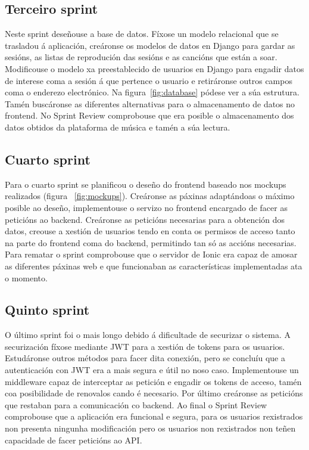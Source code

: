 \subsection{Terceiro sprint}
Neste sprint deseñouse a base de datos. Fíxose un modelo relacional que se trasladou á aplicación, creáronse os modelos de datos en Django para gardar as sesións, as listas de reprodución das sesións e as cancións que están a soar. Modificouse o modelo xa preestablecido de usuarios en Django para engadir datos de interese coma a sesión á que pertence o usuario e retiráronse outros campos coma o enderezo electrónico. Na figura~\ref{fig:database} pódese ver a súa estrutura. Tamén buscáronse as diferentes alternativas para o almacenamento de datos no frontend.\smallbreak
No Sprint Review comprobouse que era posible o almacenamento dos datos obtidos da plataforma de música e tamén a súa lectura.

\subsection{Cuarto sprint}
Para o cuarto sprint se planificou o deseño do frontend baseado nos mockups realizados (figura ~\ref{fig:mockups}). Creáronse as páxinas adaptándoas o máximo posible ao deseño, implementouse o servizo no frontend encargado de facer as peticións ao backend. Creáronse as peticións necesarias para a obtención dos datos, creouse a xestión de usuarios tendo en conta os permisos de acceso tanto na parte do frontend coma do backend, permitindo tan só as accións necesarias.\smallbreak
Para rematar o sprint comprobouse que o servidor de Ionic era capaz de amosar as diferentes páxinas web e que funcionaban as características implementadas ata o momento.

\subsection{Quinto sprint}
O último sprint foi o mais longo debido á dificultade de securizar o sistema. A securización fíxose mediante \acrshort{JWT} para a xestión de tokens para os usuarios. Estudáronse outros métodos para facer dita conexión, pero se concluíu que a autenticación con \acrshort{JWT} era a mais segura e útil no noso caso. Implementouse un middleware capaz de interceptar as petición e engadir os tokens de acceso, tamén coa posibilidade de renovalos cando é necesario. Por último creáronse as peticións que restaban para a comunicación co backend.\smallbreak
Ao final o Sprint Review comprobouse que a aplicación era funcional e segura, para os usuarios rexistrados non presenta ningunha modificación pero os usuarios non rexistrados non teñen capacidade de facer peticións ao API.

